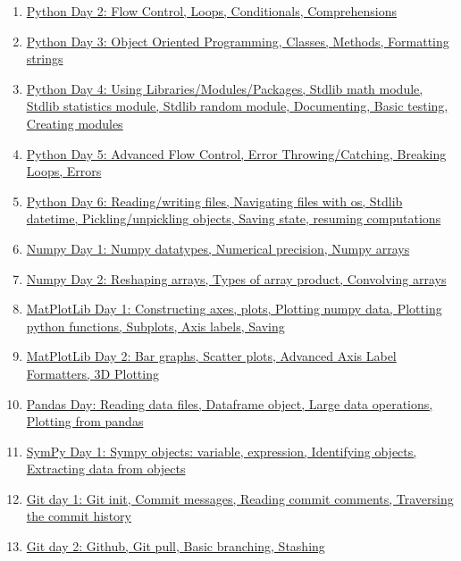 \documentclass[11pt]{article}
\begin{document}
\begin{enumerate}
	\item \href{https://mp.weixin.qq.com/s/72Nuh5q5NXbfKThyFu3ffA}{Python Day 2: Flow Control, Loops, Conditionals, Comprehensions}	%
	\item \href{https://mp.weixin.qq.com/s/BRxpt2tGk8DGoKg1SHydAg}{Python Day 3: Object Oriented Programming, Classes, Methods, Formatting strings}	%
	\item \href{https://mp.weixin.qq.com/s/xnNtKtqafZprM67zsDD29A}{Python Day 4: Using Libraries/Modules/Packages, Stdlib math module, Stdlib statistics module, Stdlib random module, Documenting, Basic testing, Creating modules}	%
	\item \href{https://mp.weixin.qq.com/s/s61iXhISY5-FPkcNH9Jeow}{Python Day 5: Advanced Flow Control, Error Throwing/Catching, Breaking Loops, Errors}	%
	\item \href{https://mp.weixin.qq.com/s/0f_t9pX_T5SjgqXv9UwR2g}{Python Day 6: Reading/writing files, Navigating files with os, Stdlib datetime, Pickling/unpickling objects, Saving state, resuming computations}	%
	\item \href{https://mp.weixin.qq.com/s/YXurLSB6Q3V-GUcA2f0umw}{Numpy Day 1: Numpy datatypes, Numerical precision, Numpy arrays}	%
	\item \href{https://mp.weixin.qq.com/s/wBz8zadRAp2hYqooWC-bUA}{Numpy Day 2: Reshaping arrays, Types of array product, Convolving arrays}	%
	\item \href{https://mp.weixin.qq.com/s/Nz_Q7i5KYig_KY9mtipLeg}{MatPlotLib Day 1: Constructing axes, plots, Plotting numpy data, Plotting python functions, Subplots, Axis labels, Saving}	%
	\item \href{https://mp.weixin.qq.com/s/sbAYfwT6ybi_E2xgVbqFOA}{MatPlotLib Day 2: Bar graphs, Scatter plots, Advanced Axis Label Formatters, 3D Plotting}	%
	\item \href{https://mp.weixin.qq.com/s/-ejzQVzBpbe-qSnfg0lXoQ}{Pandas Day: Reading data files, Dataframe object, Large data operations, Plotting from pandas}	%
	\item \href{https://mp.weixin.qq.com/s/B2JHqTaWcvOlwnz35foTBA}{SymPy Day 1: Sympy objects: variable, expression, Identifying objects, Extracting data from objects}	%
	\item \href{https://mp.weixin.qq.com/s/bAamUZzIxQWD0cWBl6v6Bw}{Git day 1: Git init, Commit messages, Reading commit comments, Traversing the commit history}	%
	\item \href{https://mp.weixin.qq.com/s/mz1-8DiimtTVKFF911JyDw}{Git day 2: Github, Git pull, Basic branching, Stashing}	%

\end{enumerate}
\end{document}
